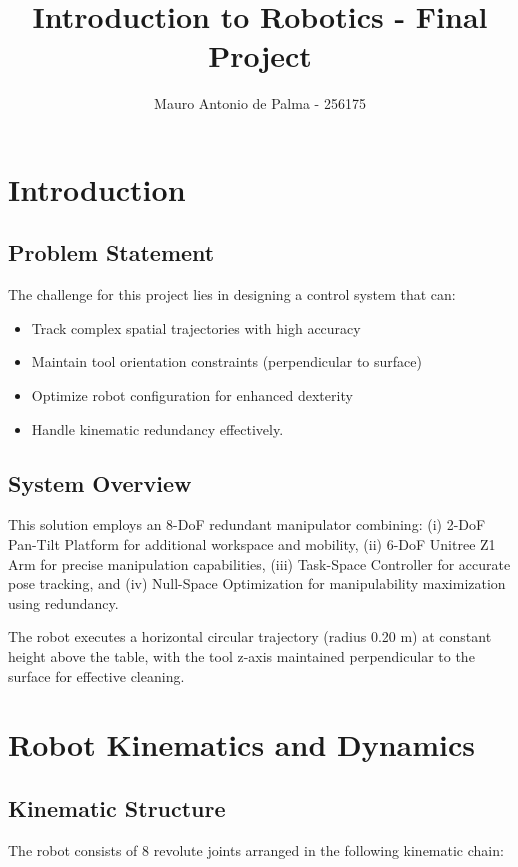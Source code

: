 \documentclass[journal,10pt,twocolumn]{IEEEtran}
\begin{document}
\title{Introduction to Robotics - Final Project}
\author{Mauro Antonio de Palma - 256175}

\maketitle

\section{Introduction}

\subsection{Problem Statement}
The challenge for this project lies in designing a control system that can:
\begin{itemize}
	\item Track complex spatial trajectories with high accuracy
	\item Maintain tool orientation constraints (perpendicular to surface)
	\item Optimize robot configuration for enhanced dexterity
	\item Handle kinematic redundancy effectively.
\end{itemize}

\subsection{System Overview}
This solution employs an 8-DoF redundant manipulator combining: (i) 2-DoF Pan-Tilt Platform for additional workspace and mobility, (ii) 6-DoF Unitree Z1 Arm for precise manipulation capabilities, (iii) Task-Space Controller for accurate pose tracking, and (iv) Null-Space Optimization for manipulability maximization using redundancy.

The robot executes a horizontal circular trajectory (radius 0.20 m) at constant height above the table, with the tool z-axis maintained perpendicular to the surface for effective cleaning.

\section{Robot Kinematics and Dynamics}

\subsection{Kinematic Structure}
The robot consists of 8 revolute joints arranged in the following kinematic chain:
\end{document}
